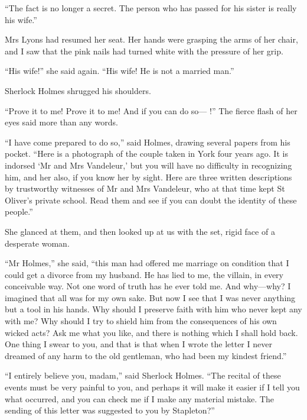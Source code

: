 \documentclass[paper=5.5in:8.5in,BCOR=7mm,twoside,DIV=calc,12pt,usegeometry,openany,chapterprefix,endperiod]{scrbook} %
\begin{document}
\enquote{The fact is no longer a secret. The person who has passed for his sister is really his wife.}

Mrs Lyons had resumed her seat. Her hands were grasping the arms of her chair, and I saw that the pink nails had turned white with the pressure of her grip.

\enquote{His wife!} she said again. \enquote{His wife! He is not a married man.}

Sherlock Holmes shrugged his shoulders.

\enquote{Prove it to me! Prove it to me! And if you can do so\nobreakdash--- !} The fierce flash of her eyes said more than any words.


\enquote{I have come prepared to do so,} said Holmes, drawing several papers from his pocket. \enquote{Here is a photograph of the couple taken in York four years ago. It is indorsed \enquote{Mr and Mrs Vandeleur,} but you will have no difficulty in recognizing him, and her also, if you know her by sight. Here are three written descriptions by trustworthy witnesses of Mr and Mrs Vandeleur, who at that time kept St Oliver's private school. Read them and see if you can doubt the identity of these people.}

She glanced at them, and then looked up at us with the set, rigid face of a desperate woman.

\enquote{Mr Holmes,} she said, \enquote{this man had offered me marriage on condition that I could get a divorce from my husband. He has lied to me, the villain, in every conceivable way. Not one word of truth has he ever told me. And why\nobreakdash---why? I imagined that all was for my own sake. But now I see that I was never anything but a tool in his hands. Why should I preserve faith with him who never kept any with me? Why should I try to shield him from the consequences of his own wicked acts? Ask me what you like, and there is nothing which I shall hold back. One thing I swear to you, and that is that when I wrote the letter I never dreamed of any harm to the old gentleman, who had been my kindest friend.}

\enquote{I entirely believe you, madam,} said Sherlock Holmes. \enquote{The recital of these events must be very painful to you, and perhaps it will make it easier if I tell you what occurred, and you can check me if I make any material mistake. The sending of this letter was suggested to you by Stapleton?}
\end{document}
